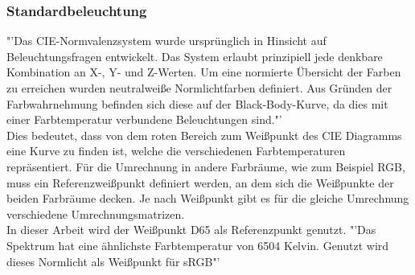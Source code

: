 \documentclass[11pt]{scrartcl}
\begin{document}
\subsubsection{Standardbeleuchtung} \label{whiteRef}
"'Das CIE-Normvalenzsystem wurde ursprünglich in Hinsicht auf Beleuchtungsfragen entwickelt. Das System erlaubt prinzipiell jede denkbare Kombination an X-, Y-
und Z-Werten. Um eine normierte Übersicht der Farben zu erreichen wurden neutralweiße Normlichtfarben definiert. Aus Gründen der Farbwahrnehmung befinden sich diese
auf der Black-Body-Kurve, da dies mit einer Farbtemperatur verbundene Beleuchtungen sind."' \cite{wikipediaCIE}\\
Dies bedeutet, dass von dem roten Bereich zum Weißpunkt des CIE Diagramms eine Kurve zu finden ist, welche die verschiedenen Farbtemperaturen repräsentiert. Für die Umrechnung
in andere Farbräume, wie zum Beispiel RGB, muss ein Referenzweißpunkt definiert werden, an dem sich die Weißpunkte der beiden Farbräume decken. Je nach Weißpunkt gibt es 
für die gleiche Umrechnung verschiedene Umrechnungsmatrizen.\\
In dieser Arbeit wird der Weißpunkt D65 als Referenzpunkt genutzt. "'Das Spektrum hat eine ähnlichste Farbtemperatur von 6504 Kelvin. Genutzt wird dieses Normlicht als Weißpunkt für sRGB"' \cite{wikipediaCIE}
\end{document}
